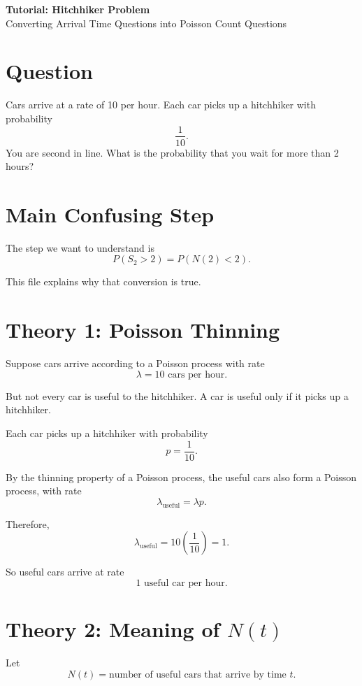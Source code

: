 \documentclass[12pt]{article}
\begin{document}
\begin{center}
    {\Large \textbf{Tutorial: Hitchhiker Problem}}\\
    \vspace{0.2cm}
    {\large Converting Arrival Time Questions into Poisson Count Questions}
\end{center}

\section*{Question}

Cars arrive at a rate of 10 per hour. Each car picks up a hitchhiker with probability
\[
\frac{1}{10}.
\]
You are second in line. What is the probability that you wait for more than 2 hours?

\section*{Main Confusing Step}

The step we want to understand is
\[
P(S_2>2)=P(N(2)<2).
\]

This file explains why that conversion is true.

\section*{Theory 1: Poisson Thinning}

Suppose cars arrive according to a Poisson process with rate
\[
\lambda = 10 \text{ cars per hour}.
\]

But not every car is useful to the hitchhiker. A car is useful only if it picks up a
hitchhiker.

Each car picks up a hitchhiker with probability
\[
p=\frac{1}{10}.
\]

By the thinning property of a Poisson process, the useful cars also form a Poisson
process, with rate
\[
\lambda_{\text{useful}} = \lambda p.
\]

Therefore,
\[
\lambda_{\text{useful}}
=
10\left(\frac{1}{10}\right)
=
1.
\]

So useful cars arrive at rate
\[
\boxed{1 \text{ useful car per hour}.}
\]

\section*{Theory 2: Meaning of \(N(t)\)}

Let
\[
N(t)=\text{number of useful cars that arrive by time }t.
\]
\end{document}
